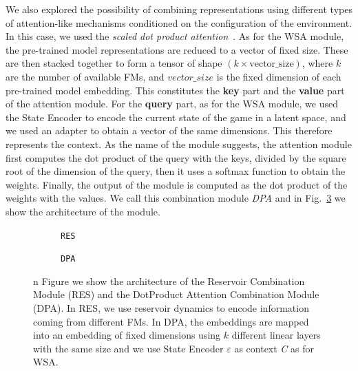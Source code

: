 We also explored the possibility of combining representations using different types of attention-like mechanisms conditioned on the configuration of the environment.
In this case, we used the \textit{scaled dot product attention}~\citep{vaswani2017attention}.
As for the WSA module, the pre-trained model representations are reduced to a vector of fixed size.
These are then stacked together to form a tensor of shape $(k \times \text{vector\_size})$, where $k$ are the number of available FMs, and $vector\_size$ is the fixed dimension of each pre-trained model embedding.
This constitutes the \textbf{key} part and the \textbf{value} part of the attention module.
For the \textbf{query} part, as for the WSA module, we used the State Encoder to encode the current state of the game in a latent space, and we used an adapter to obtain a vector of the same dimensions.
This therefore represents the context.
As the name of the module suggests, the attention module first computes the dot product of the query with the keys, divided by the square root of the dimension of the query, then it uses a softmax function to obtain the weights.
Finally, the output of the module is computed as the dot product of the weights with the values.
We call this combination module \textit{DPA} and in Fig.~\ref{fig:dpa_combination} we show the architecture of the module.


\begin{figure}[ht]
    \centering
    \begin{subfigure}[b]{0.47\textwidth}
        \centering
        \fbox{\rule[-.5cm]{0cm}{4cm} \rule[-.5cm]{4cm}{0cm}}
        \caption{\texttt{RES}}
        \label{fig:reservoir_combination}
    \end{subfigure}
    \hfill
    \begin{subfigure}[b]{0.47\textwidth}
        \centering
        \fbox{\rule[-.5cm]{0cm}{4cm} \rule[-.5cm]{4cm}{0cm}}
        \caption{\texttt{DPA}}
        \label{fig:dpa}
    \end{subfigure}

    \caption{n Figure we show the architecture of the Reservoir Combination Module (RES) and the DotProduct Attention Combination Module (DPA). In RES, we use reservoir dynamics to encode information coming from different FMs. In DPA, the embeddings are mapped into an embedding of fixed dimensions using $k$ different linear layers with the same size and we use State Encoder $\varepsilon$ as context \textit{C} as for WSA.}
    \label{fig:dpa_combination}
\end{figure}

